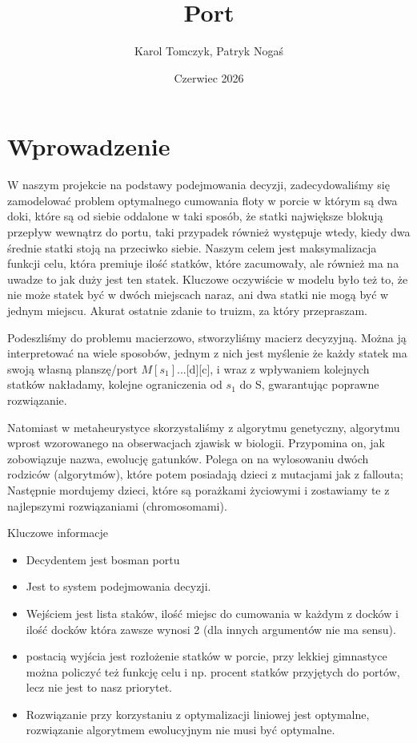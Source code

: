 \documentclass{article}
\title{Port}
\author{Karol Tomczyk, Patryk Nogaś}
\date{Czerwiec 2026}
\begin{document}
\maketitle

\section{Wprowadzenie}

W naszym projekcie na podstawy podejmowania decyzji, zadecydowaliśmy się zamodelować problem optymalnego cumowania floty w porcie w którym są dwa doki, które są od siebie oddalone w taki sposób, że statki największe blokują przepływ wewnątrz do portu, taki przypadek również występuje wtedy, kiedy dwa średnie statki stoją na przeciwko siebie. Naszym celem jest maksymalizacja funkcji celu, która premiuje ilość statków, które zacumowały, ale również ma na uwadze to jak duży jest ten statek. Kluczowe oczywiście w modelu było też to, że nie może statek być w dwóch miejscach naraz, ani dwa statki nie mogą być w jednym miejscu. Akurat ostatnie zdanie to truizm, za który przepraszam.

\hfill

Podeszliśmy do problemu macierzowo, stworzyliśmy macierz decyzyjną. Można ją interpretować na wiele sposobów, jednym z nich jest myślenie że każdy statek ma swoją własną planszę/port \emph{$M[s_{1}]$}...[d][c], i wraz z wpływaniem kolejnych statków nakładamy, kolejne ograniczenia od $s_1$ do S, gwarantując poprawne rozwiązanie.

\hfill

Natomiast w metaheurystyce skorzystaliśmy z algorytmu genetyczny, algorytmu wprost wzorowanego na obserwacjach zjawisk w biologii. Przypomina on, jak zobowiązuje nazwa, ewolucję gatunków. Polega on na wylosowaniu dwóch rodziców (algorytmów), które potem posiadają dzieci z mutacjami jak z fallouta; Następnie mordujemy dzieci, które są porażkami życiowymi i zostawiamy te z najlepszymi rozwiązaniami (chromosomami).

\hfill

\raggedright{Kluczowe informacje}
\begin{itemize}
    \item Decydentem jest bosman portu
    \item Jest to system podejmowania decyzji.
    \item Wejściem jest lista staków, ilość miejsc do cumowania w każdym z docków i ilość docków która zawsze wynosi 2 (dla innych argumentów nie ma sensu).
    \item postacią wyjścia jest rozłożenie statków w porcie, przy lekkiej gimnastyce można policzyć też funkcję celu i np. procent statków przyjętych do portów, lecz nie jest to nasz priorytet. 
    \item Rozwiązanie przy korzystaniu z optymalizacji liniowej jest optymalne, rozwiązanie algorytmem ewolucyjnym nie musi być optymalne.
\end{itemize}
\end{document}
